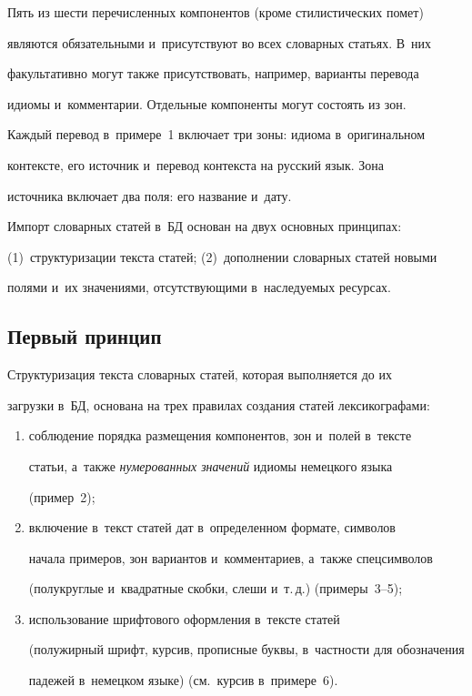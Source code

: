    Пять из шести перечисленных компонентов (кроме стилистических помет) 

являются обязательными и~присутствуют во всех словарных статьях. В~них 

факультативно могут также присутствовать, например, варианты перевода 

идиомы и~комментарии. Отдельные компоненты могут состоять из зон. 

Каждый перевод в~примере~1 включает три зоны: идиома в~оригинальном 

контексте, его источник и~перевод контекста на русский язык. Зона 

источника включает два поля: его название и~дату.

   

   Импорт словарных статей в~БД основан на двух основных принципах: 

(1)~структуризации текста статей; (2)~дополнении словарных статей новыми 

полями и~их значениями, отсутствующими в~наследуемых ресурсах.

   

\subsection{Первый принцип}



   Структуризация текста словарных статей, которая выполняется до их 

загрузки в~БД, основана на трех правилах создания статей лексикографами:

   \begin{enumerate}[(1)]

   \item  соблюдение порядка размещения компонентов, зон и~полей в~тексте 

статьи, а~также \textit{нумерованных значений} идиомы немецкого языка 

(пример~2);

   \item включение в~текст статей дат в~определенном формате, символов 

начала примеров, зон вариантов и~комментариев, а~также спецсимволов 

(полукруглые и~квадратные скобки, слеши и~т.\,д.) (примеры~3--5);

   \item использование шрифтового оформления в~тексте статей 

(полужирный шрифт, курсив, прописные буквы, в~частности для обозначения 

падежей в~немецком языке) (см.\ курсив в~примере~6).

   \end{enumerate}

